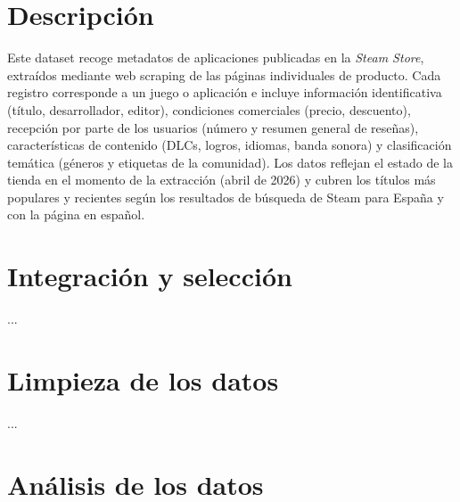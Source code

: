 \documentclass[
]{article}
\author{}
\date{\vspace{-2.5em}}
\begin{document}
\sinportada


\section{Descripción}\label{descripciuxf3n}

Este dataset recoge metadatos de aplicaciones publicadas en la \textit{Steam Store}, extraídos mediante web scraping de las páginas individuales de producto. Cada registro corresponde a un juego o aplicación e incluye información identificativa (título, desarrollador, editor), condiciones comerciales (precio, descuento), recepción por parte de los usuarios (número y resumen general de reseñas), características de contenido (DLCs, logros, idiomas, banda sonora) y clasificación temática (géneros y etiquetas de la comunidad). Los datos reflejan el estado de la tienda en el momento de la extracción (abril de 2026) y cubren los títulos más populares y recientes según los resultados de búsqueda de Steam para España y con la página en español.

\section{Integración y selección}\label{integraciuxf3n-y-selecciuxf3n}

...

\section{Limpieza de los datos}\label{limpieza-de-los-datos}

...

\section{Análisis de los datos}\label{anuxe1lisis-de-los-datos}
\end{document}
